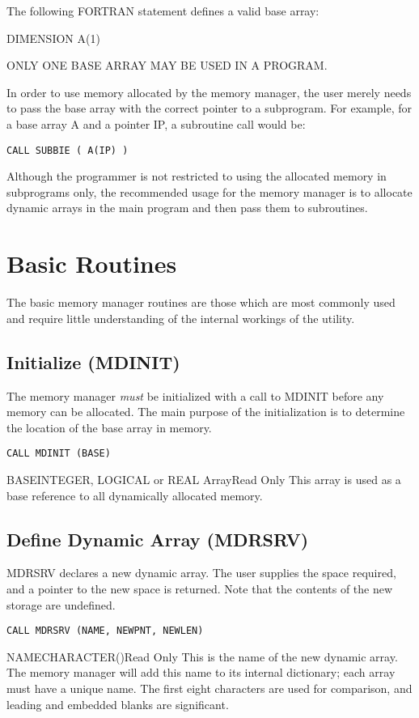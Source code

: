 The following FORTRAN statement defines a valid base array:

DIMENSION A(1)

ONLY ONE BASE ARRAY MAY BE USED IN A PROGRAM.

In order to use memory allocated by the memory manager, the user merely
needs to pass the base array with the correct pointer to a subprogram.  For
example, for a base array A and a pointer IP, a subroutine call would be:

\verb+CALL SUBBIE ( A(IP) )+

Although the programmer is not restricted to using the allocated memory in
subprograms only, the recommended usage for the memory manager is to
allocate dynamic arrays in the main program and then pass them to
subroutines.


\section{Basic Routines}\label{sec:mbas}
The basic memory manager routines are those which are most commonly used and
require little understanding of the internal workings of the utility.

\subsection{Initialize (MDINIT)}
The memory manager {\em must} be initialized with a call to MDINIT before
any memory can be allocated.  The main purpose of the initialization is to
determine the location of the base array in memory.

\verb+CALL MDINIT (BASE)+

\begin{argy}{BASE}{INTEGER, LOGICAL or REAL Array}{Read Only}
This array is used as a base reference to all dynamically allocated memory.
\end{argy}

\subsection{Define Dynamic Array (MDRSRV)}
MDRSRV declares a new dynamic array.  The user supplies the space required,
and a pointer to the new space is returned.  Note that the contents of the
new storage are undefined.

\verb+CALL MDRSRV (NAME, NEWPNT, NEWLEN)+

\begin{argy}{NAME}{CHARACTER\last(\last)}{Read Only}
This is the name of the new dynamic array. The memory manager will add this
name to its internal dictionary; each array must have a unique name.  The
first eight characters are used for comparison, and leading and embedded
blanks are significant.
\end{argy}

